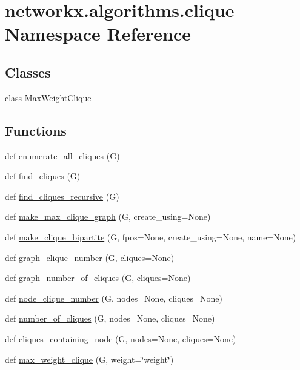 \hypertarget{namespacenetworkx_1_1algorithms_1_1clique}{}\section{networkx.\+algorithms.\+clique Namespace Reference}
\label{namespacenetworkx_1_1algorithms_1_1clique}
\subsection*{Classes}
\begin{DoxyCompactItemize}
\item 
class \hyperlink{classnetworkx_1_1algorithms_1_1clique_1_1MaxWeightClique}{Max\+Weight\+Clique}
\end{DoxyCompactItemize}
\subsection*{Functions}
\begin{DoxyCompactItemize}
\item 
def \hyperlink{namespacenetworkx_1_1algorithms_1_1clique_a5afae1d234e0fde85e9fbe4722f4b786}{enumerate\+\_\+all\+\_\+cliques} (G)
\item 
def \hyperlink{namespacenetworkx_1_1algorithms_1_1clique_a9e5f7c53376e84c56ea967a673b8c6bc}{find\+\_\+cliques} (G)
\item 
def \hyperlink{namespacenetworkx_1_1algorithms_1_1clique_a0ae8791cb3fbabc4195e5e1bf11b66c3}{find\+\_\+cliques\+\_\+recursive} (G)
\item 
def \hyperlink{namespacenetworkx_1_1algorithms_1_1clique_aac9c1881d34c45c7cfcae3ad3e2f14b2}{make\+\_\+max\+\_\+clique\+\_\+graph} (G, create\+\_\+using=None)
\item 
def \hyperlink{namespacenetworkx_1_1algorithms_1_1clique_a866d9770533ac4a124b03e7c8adfc3d1}{make\+\_\+clique\+\_\+bipartite} (G, fpos=None, create\+\_\+using=None, name=None)
\item 
def \hyperlink{namespacenetworkx_1_1algorithms_1_1clique_a15ffd48517246617d89714f137b9c04a}{graph\+\_\+clique\+\_\+number} (G, cliques=None)
\item 
def \hyperlink{namespacenetworkx_1_1algorithms_1_1clique_a9e77cc301d15b809def1d0f35945a380}{graph\+\_\+number\+\_\+of\+\_\+cliques} (G, cliques=None)
\item 
def \hyperlink{namespacenetworkx_1_1algorithms_1_1clique_ae7b5c17115637c1f7c9a319b1f08c6af}{node\+\_\+clique\+\_\+number} (G, nodes=None, cliques=None)
\item 
def \hyperlink{namespacenetworkx_1_1algorithms_1_1clique_a715dddf1461fea94accb43717f4e7fb6}{number\+\_\+of\+\_\+cliques} (G, nodes=None, cliques=None)
\item 
def \hyperlink{namespacenetworkx_1_1algorithms_1_1clique_a2b1d135f2e0c7acc72c11fef57055a28}{cliques\+\_\+containing\+\_\+node} (G, nodes=None, cliques=None)
\item 
def \hyperlink{namespacenetworkx_1_1algorithms_1_1clique_a19437be8e85651bb15f27f39d9f88755}{max\+\_\+weight\+\_\+clique} (G, weight=\char`\"{}weight\char`\"{})
\end{DoxyCompactItemize}


